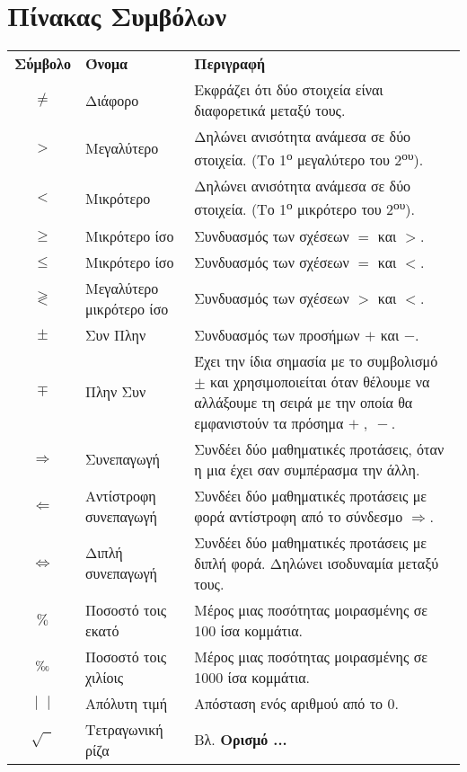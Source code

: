 \documentclass[twoside,11pt,a4paper]{book}
\DeclareRobustCommand{\perthousand}{%
\ifmmode
\text{\textperthousand}%
\else
\textperthousand
\fi}
\begin{document}
\chapter*{Πίνακας Συμβόλων}
{\par\centering

\begin{tabularx}{\textwidth}{c>{\centering}m{3.1cm}K}
\hline\rule[-2ex]{0pt}{5.5ex}\textbf{Σύμβολο} & \textbf{Όνομα} & \textbf{Περιγραφή}\\
\hhline{===}\rule[-2ex]{0pt}{8.5ex}
$ \neq $ & Διάφορο & Εκφράζει ότι δύο στοιχεία είναι διαφορετικά μεταξύ τους.\\
\rule[-2ex]{0pt}{5.5ex}
$ > $ & Μεγαλύτερο & Δηλώνει ανισότητα ανάμεσα σε δύο στοιχεία. (Το 1\textsuperscript{ο} μεγαλύτερο του 2\textsuperscript{ου}).\\
\rule[-2ex]{0pt}{5.5ex}
$ < $ & Μικρότερο & Δηλώνει ανισότητα ανάμεσα σε δύο στοιχεία. (Το 1\textsuperscript{ο} μικρότερο του 2\textsuperscript{ου}).\\
\rule[-2ex]{0pt}{5.5ex}
$ \geq $ & Μικρότερο ίσο & Συνδυασμός των σχέσεων $=$ και $>$.\\
\rule[-2ex]{0pt}{5.5ex}
$ \leq $ & Μικρότερο ίσο & Συνδυασμός των σχέσεων $=$ και $<$.\\
\rule[-2ex]{0pt}{5.5ex}
$ \gtrless $ & Μεγαλύτερο μικρότερο ίσο & Συνδυασμός των σχέσεων $>$ και $<$.\\
\rule[-2ex]{0pt}{5.5ex}
$ \pm $ & Συν Πλην & Συνδυασμός των προσήμων $+$ και $-$.\\
\rule[-2ex]{0pt}{5.5ex}
$ \mp $ & Πλην Συν & Έχει την ίδια σημασία με το συμβολισμό $\pm$  και χρησιμοποιείται όταν θέλουμε να αλλάξουμε τη σειρά με την οποία θα εμφανιστούν τα πρόσημα $+\;,\;-$. \\
\rule[-2ex]{0pt}{7ex}
$ \Rightarrow $ & Συνεπαγωγή & Συνδέει δύο μαθηματικές προτάσεις, όταν η μια έχει σαν συμπέρασμα την άλλη. \\
\rule[-2ex]{0pt}{7ex}
$ \Leftarrow $ & Αντίστροφη συνεπαγωγή & Συνδέει δύο μαθηματικές προτάσεις με φορά αντίστροφη από το σύνδεσμο $ \Rightarrow $. \\
\rule[-2ex]{0pt}{7ex}
$ \Leftrightarrow $ & Διπλή συνεπαγωγή & Συνδέει δύο μαθηματικές προτάσεις με διπλή φορά. Δηλώνει ισοδυναμία μεταξύ τους.  \\
\rule[-2ex]{0pt}{7ex}
$ \% $ & Ποσοστό τοις εκατό & Μέρος μιας ποσότητας μοιρασμένης σε 100 ίσα κομμάτια. \\
\rule[-2ex]{0pt}{7ex}
$ \perthousand $ & Ποσοστό τοις χιλίοις & Μέρος μιας ποσότητας μοιρασμένης σε 1000 ίσα κομμάτια. \\
\rule[-2ex]{0pt}{5.5ex}
$ |\;\;| $ & Απόλυτη τιμή & Απόσταση ενός αριθμού από το 0. \\
\rule[-2ex]{0pt}{5.5ex}
$ \sqrt{\;\;} $ & Τετραγωνική ρίζα & Βλ. \textbf{Ορισμό ...} \\
\hline
\end{tabularx}
\par}
\end{document}
